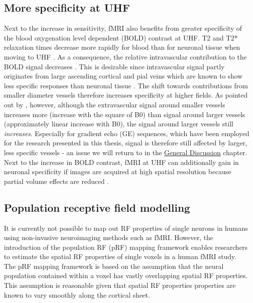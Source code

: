 \subsection{More specificity at UHF}
Next to the increase in sensitivity, fMRI also benefits from greater specificity of the blood oxygenation level dependent (BOLD) contrast at UHF. T2 and T2* relaxation times decrease more rapidly for blood than for neuronal tissue when moving to UHF \parencite{Ugurbil2002}. As a consequence, the relative intravascular contribution to the BOLD signal decreases \parencite{Uludag2009, Uludag2016}. This is desirable since intravascular signal partly originates from large ascending cortical and pial veins which are known to show less specific responses than neuronal tissue \parencite{DeMartino2016, Moerel2017}. The shift towards contributions from smaller diameter vessels therefore increases specificity at higher fields. As pointed out by \cite{DeMartino2016}, however, although the extravascular signal around smaller vessels increases more (increase with the square of B0) than signal around larger vessels (approximately linear increase with B0), the signal around larger vessels still \textit{increases}. Especially for gradient echo (GE) sequences, which have been employed for the research presented in this thesis, signal is therefore still affected by larger, less specific vessels - an issue we will return to in the \hyperref[ch:chapter05]{General Discussion} chapter. Next to the increase in BOLD contrast, fMRI at UHF can additionally gain in neuronal specificity if images are acquired at high spatial resolution because partial volume effects are reduced \parencite{DeMartino2016}.

\subsection{Population receptive field modelling}
It is currently not possible to map out RF properties of single neurons in humans using non-invasive neuroimaging methods such as fMRI. However, the introduction of the population RF (pRF) mapping framework \parencite{Dumoulin2008} enables researchers to estimate the spatial RF properties of single voxels in a human fMRI study. The pRF mapping framework is based on the assumption that the neural population contained within a voxel has vastly overlapping spatial RF properties. This assumption is reasonable given that spatial RF properties properties are known to vary smoothly along the cortical sheet.

